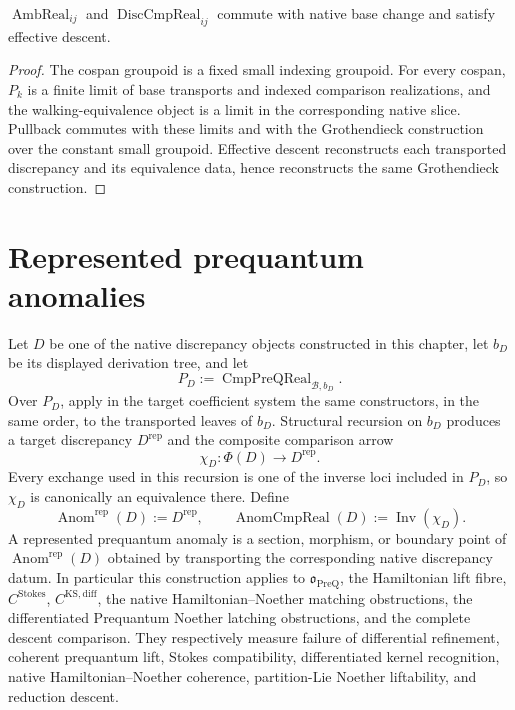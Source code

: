 \begin{proposition}
\label{prop:prequantum-typed-discrepancy-comparison-locality}
$\operatorname{AmbReal}_{ij}$ and $\operatorname{DiscCmpReal}_{ij}$ commute
with native base change and satisfy effective descent.
\end{proposition}

\begin{proof}
The cospan groupoid is a fixed small indexing groupoid.  For every cospan,
$P_k$ is a finite limit of base transports and indexed comparison realizations,
and the walking-equivalence object is a limit in the corresponding native
slice.  Pullback commutes with these limits and with the Grothendieck
construction over the constant small groupoid.  Effective descent reconstructs
each transported discrepancy and its equivalence data, hence reconstructs the
same Grothendieck construction.
\end{proof}

\section{Represented prequantum anomalies}
\label{sec:prequantum-anomalies}

\begin{definition}
\label{def:prequantum-represented-anomaly}
Let $D$ be one of the native discrepancy objects constructed in this chapter,
let $b_D$ be its displayed derivation tree, and let
\[
P_D:=\operatorname{CmpPreQReal}_{\mathcal B,b_D}.
\]
Over $P_D$, apply in the target coefficient system the same constructors, in the
same order, to the transported leaves of $b_D$.  Structural recursion on $b_D$
produces a target discrepancy $D^{\mathrm{rep}}$ and the composite comparison
arrow
\[
\boxed{
\chi_D:\Phi(D)\longrightarrow D^{\mathrm{rep}}.
}
\]
Every exchange used in this recursion is one of the inverse loci included in
$P_D$, so $\chi_D$ is canonically an equivalence there.  Define
\[
\boxed{
\operatorname{Anom}^{\mathrm{rep}}(D):=D^{\mathrm{rep}},
\qquad
\operatorname{AnomCmpReal}(D):=\operatorname{Inv}(\chi_D).
}
\]
A represented prequantum anomaly is a section, morphism, or boundary point of
$\operatorname{Anom}^{\mathrm{rep}}(D)$ obtained by transporting the
corresponding native discrepancy datum.  In particular this construction applies
to $\mathfrak o_{\mathrm{PreQ}}$, the Hamiltonian lift fibre,
$C^{\mathrm{Stokes}}$, $C^{\mathrm{KS,diff}}$, the native
Hamiltonian--Noether matching obstructions, the differentiated Prequantum Noether
latching obstructions, and the complete descent comparison.  They respectively
measure failure of differential refinement, coherent prequantum lift, Stokes
compatibility, differentiated kernel recognition, native Hamiltonian--Noether
coherence, partition-Lie Noether liftability, and reduction descent.
\end{definition}

